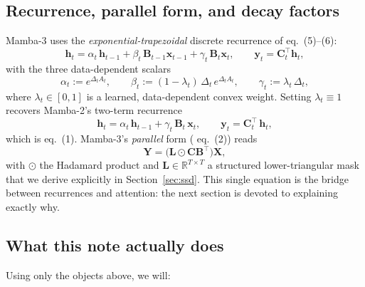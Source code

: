 \documentclass[11pt,a4paper]{article}
\begin{document}
\subsection{Recurrence, parallel form, and decay factors}

Mamba-3 uses the \emph{exponential-trapezoidal} discrete recurrence of
\cite{mamba3} eq.~(5)–(6):
\begin{equation}\label{eq:rec3}
  \bm{h}_t = \alpha_t\,\bm{h}_{t-1}
            + \beta_t\,\bm{B}_{t-1}\bm{x}_{t-1}
            + \gamma_t\,\bm{B}_t\bm{x}_t,
  \qquad
  \bm{y}_t = \bm{C}_t^\top\bm{h}_t,
\end{equation}
with the three data-dependent scalars
\begin{equation}\label{eq:abc}
  \alpha_t := e^{\Delta_t A_t},
  \qquad
  \beta_t  := (1 - \lambda_t)\,\Delta_t\,e^{\Delta_t A_t},
  \qquad
  \gamma_t := \lambda_t\,\Delta_t,
\end{equation}
where $\lambda_t \in [0,1]$ is a learned, data-dependent convex weight.
Setting $\lambda_t \equiv 1$ recovers Mamba-2's two-term recurrence
\begin{equation}\label{eq:rec2}
  \bm{h}_t = \alpha_t\,\bm{h}_{t-1} + \gamma_t\,\bm{B}_t\,\bm{x}_t,
  \qquad
  \bm{y}_t = \bm{C}_t^\top\,\bm{h}_t,
\end{equation}
which is \cite{mamba3} eq.~(1). Mamba-3's \emph{parallel} form
(\cite{mamba3} eq.~(2)) reads
\begin{equation}\label{eq:ssd}
  \bm{Y} = \bigl(\bm{L}\odot\bm{C}\bm{B}^\top\bigr)\bm{X},
\end{equation}
with $\odot$ the Hadamard product and $\bm{L}\in\mathbb{R}^{T\times T}$
a structured lower-triangular mask that we derive explicitly in
Section~\ref{sec:ssd}. This single equation is the bridge between
recurrences and attention: the next section is devoted to explaining
exactly why.

\subsection{What this note actually does}

Using only the objects above, we will:
\end{document}

